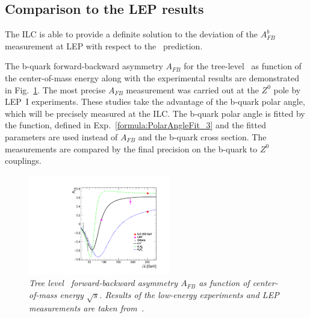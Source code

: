 \subsection{Comparison to the LEP results}
\label{sec:NewResults}
The ILC is able to provide a definite solution to the deviation of the $A_{FB}^b$ measurement at LEP with respect to the \sm\ prediction.


The b-quark forward-backward asymmetry $A_{FB}$ for the tree-level \sm\ as function of the center-of-mass energy along with the experimental results are demonstrated in Fig.~\ref{fig:LEPILC_3}. 
The most precise $A_{FB}$ measurement was carried out at the $Z^0$ pole by LEP~I experiments. 
These studies take the advantage of the b-quark polar angle, which will be precisely measured at the ILC. 
The b-quark polar angle is fitted by the function, defined in Exp.~\ref{formula:PolarAngleFit_3} and the fitted parameters are used instead of $A_{FB}$ and the b-quark cross section.
The measurements are compared by the final precision on the b-quark to $Z^0$ couplings.%
\begin{figure}
	{\centering
		\includegraphics[width=0.55\textwidth]{ILD/plots/afb-sqrts.pdf}
		\caption{\sl Tree level \sm\ forward-backward asymmetry $A_{FB}$ as function of center-of-mass energy $\sqrt{s}$.  Results of the low-energy experiments and LEP measurements are taken from~\cite{bib:RSTOP}. 
		}
		\label{fig:LEPILC_3}
	}
	
\end{figure}


